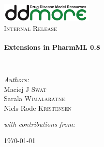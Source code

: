 \begin{titlepage}
\begin{center}

\includegraphics[width=0.35\textwidth]{./logo/ddmore_logo}~\\[1cm]

%
\textsc{\Large Internal Release}\\[0.5cm]

\HRule \\[0.4cm]
{ \huge \bfseries Extensions in PharmML 0.8 \\[0.4cm] }

\HRule \\[1.5cm]

\begin{minipage}{0.5\textwidth}
\begin{flushleft} \large
\emph{Authors:}\\
Maciej J \textsc{Swat}\\
Sarala \textsc{Wimalaratne}\\
Niels Rode \textsc{Kristensen}\\
\end{flushleft}
\end{minipage}
\begin{minipage}{0.4\textwidth}
\begin{flushright} \large
\emph{with contributions from:} \\
\end{flushright}
\end{minipage}




\vfill

{\large \today \\}

\end{center}
\end{titlepage}
